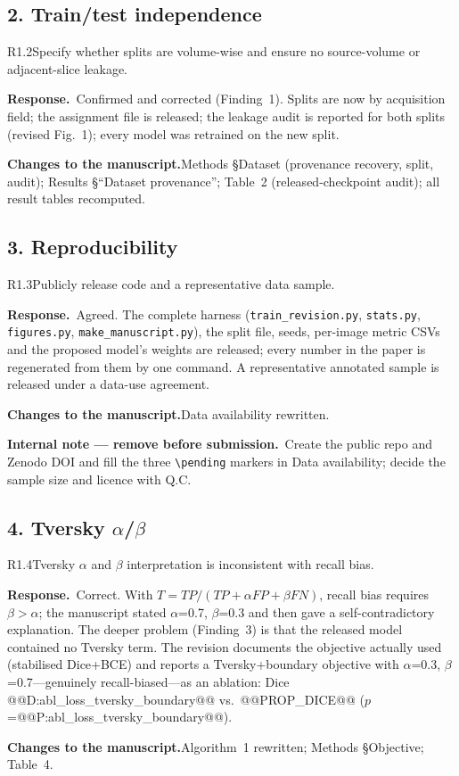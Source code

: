 \documentclass[11pt]{article}
\newif\ifinternal \internaltrue
\newcommand{\response}{\par\medskip\noindent\textbf{\color{bblue}Response.}\ }
\newcommand{\actions}{\par\medskip\noindent\textbf{Changes to the manuscript.}}
\newcommand{\internalnote}[1]{\ifinternal\begin{tcolorbox}[breakable,colback=notebg,colframe=notefr,boxrule=0.5pt,arc=2pt]\footnotesize\textbf{Internal note --- remove before submission.}\ #1\end{tcolorbox}\fi}
\begin{document}
\subsection*{2. Train/test independence}
\begin{rcomment}{R1.2}Specify whether splits are volume-wise and ensure no source-volume or adjacent-slice leakage.\end{rcomment}
\response Confirmed and corrected (Finding~1). Splits are now by acquisition field; the assignment file is released; the leakage audit is reported for both splits (revised Fig.~1); every model was retrained on the new split.
\actions Methods §Dataset (provenance recovery, split, audit); Results §``Dataset provenance''; Table~2 (released-checkpoint audit); all result tables recomputed.

\subsection*{3. Reproducibility}
\begin{rcomment}{R1.3}Publicly release code and a representative data sample.\end{rcomment}
\response Agreed. The complete harness (\texttt{train\_revision.py}, \texttt{stats.py}, \texttt{figures.py}, \texttt{make\_manuscript.py}), the split file, seeds, per-image metric CSVs and the proposed model's weights are released; every number in the paper is regenerated from them by one command. A representative annotated sample is released under a data-use agreement.
\actions Data availability rewritten. \internalnote{Create the public repo and Zenodo DOI and fill the three \texttt{\textbackslash pending} markers in Data availability; decide the sample size and licence with Q.C.}

\subsection*{4. Tversky $\alpha$/$\beta$}
\begin{rcomment}{R1.4}Tversky $\alpha$ and $\beta$ interpretation is inconsistent with recall bias.\end{rcomment}
\response Correct. With $T=TP/(TP+\alpha FP+\beta FN)$, recall bias requires $\beta>\alpha$; the manuscript stated $\alpha$=0.7, $\beta$=0.3 and then gave a self-contradictory explanation. The deeper problem (Finding~3) is that the released model contained no Tversky term. The revision documents the objective actually used (stabilised Dice+BCE) and reports a Tversky+boundary objective with $\alpha$=0.3, $\beta$=0.7---genuinely recall-biased---as an ablation: Dice @@D:abl_loss_tversky_boundary@@ vs.\ @@PROP_DICE@@ ($p$=@@P:abl_loss_tversky_boundary@@).
\actions Algorithm~1 rewritten; Methods §Objective; Table~4.
\end{document}
